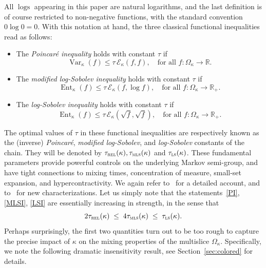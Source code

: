 \documentclass[AHL,Unicode,longabstracts,published]{cedram}
\newcommand{\R}{\mathbb{R}}
\newcommand{\cE}{\mathcal{E}}
\newcommand{\trel}{\tau_{\textsc{rel}}}
\newcommand{\tmls}{\tau_{\textsc{mls}}}
\newcommand{\tls}{\tau_{\textsc{ls}}}
\DeclareMathOperator{\ent}{Ent}
\DeclareMathOperator{\var}{Var}
\DeclareMathOperator{\logs}{logs}
\begin{document}
All $\logs$ appearing in this paper are {natural} logarithms, and the last definition is of course restricted to non-negative functions, with the standard convention $0\log 0=0$. With this notation at hand, the three classical functional inequalities read as follows:
\begin{itemize}
\item The \emph{Poincaré inequality} holds with constant $\tau$ if
\begin{equation}\label{PI}
{\var}_\kappa(f) \le \tau\, \cE_\kappa(f,f),\quad \text{for all }f\colon\Omega_\kappa\to\R.
\end{equation}
\item The \emph{modified log-Sobolev inequality} holds with constant $\tau$ if
\begin{equation}\label{MLSI}
\ent_\kappa(f) \le \tau\, \cE_\kappa\left(f,\log {f}\right),\quad \text{for all }f\colon\Omega_\kappa\to\R_+.
\end{equation}
\item The \emph{log-Sobolev inequality} holds with constant $\tau$ if
\begin{equation}\label{LSI}
\ent_\kappa(f) \le \tau\, \cE_\kappa\left(\sqrt{f},\sqrt{f}\right),\quad \text{for all }f\colon\Omega_\kappa\to\R_+.
\end{equation}
\end{itemize}


The optimal values of $\tau$ in these functional inequalities are respectively known as the (inverse) \emph{Poincaré}, \emph{modified log-Sobolev}, and \emph{log-Sobolev} constants of the chain. They will be denoted by $\trel(\kappa),\tmls(\kappa)$ and $\tls(\kappa)$. These fundamental parameters provide powerful controls on the underlying Markov semi-group, and have tight connections to mixing times, concentration of measure, small-set expansion, and hypercontractivity. We again refer to~\cite{MR2120475,MR1410112,MR2341319} for a detailed account, and to~\cite{MR3773799} for new characterizations. Let us simply note that the statements~\eqref{PI}, \eqref{MLSI}, \eqref{LSI} are essentially increasing in strength, in the sense that
\begin{equation}\label{order}
2\trel(\kappa) \; \le \; 4\tmls(\kappa) \; \le \; \tls(\kappa).
\end{equation}
Perhaps surprisingly, the first two quantities turn out to be too rough to capture the precise impact of $\kappa$ on the mixing properties of the multislice $\Omega_\kappa$. Specifically, we note the following dramatic insensitivity result, see Section~\ref{sec:colored} for details.
\end{document}
